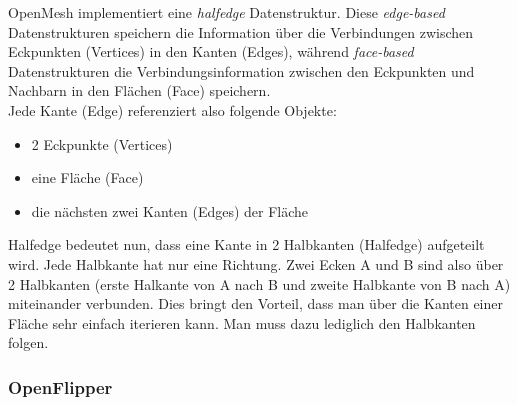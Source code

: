 OpenMesh implementiert eine \emph{halfedge} Datenstruktur.
Diese \emph{edge-based} Datenstrukturen speichern die Information über die Verbindungen zwischen Eckpunkten (Vertices) in den Kanten (Edges), während
\emph{face-based} Datenstrukturen die Verbindungsinformation zwischen den Eckpunkten und Nachbarn in den Flächen (Face) speichern.\\
Jede Kante (Edge) referenziert also folgende Objekte:
\begin{itemize}
	\item 2 Eckpunkte (Vertices)
	\item eine Fläche (Face)
	\item die nächsten zwei Kanten (Edges) der Fläche
\end{itemize}

Halfedge bedeutet nun, dass eine Kante in 2 Halbkanten (Halfedge) aufgeteilt wird. Jede Halbkante hat nur eine Richtung.
Zwei Ecken A und B sind also über 2 Halbkanten (erste Halkante von A nach B und zweite Halbkante von B nach A) miteinander verbunden.
Dies bringt den Vorteil, dass man über die Kanten einer Fläche sehr einfach iterieren kann. Man muss dazu lediglich den Halbkanten folgen.


\subsubsection*{OpenFlipper}

